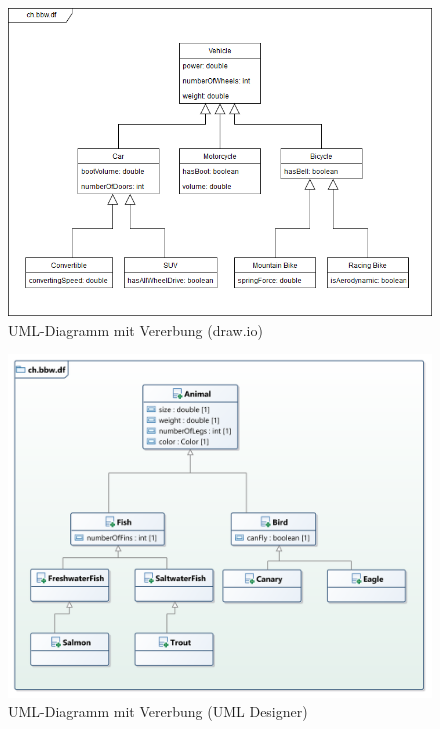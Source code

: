 \documentclass[a4paper, titlepage]{scrartcl}
\begin{document}
    \begin{figure}
        \includegraphics[width=\textwidth]{Klassendiagramm1a}
        \caption{UML-Diagramm mit Vererbung (draw.io)}
        \label{VererbungDrawIO}
    \end{figure}
    \begin{figure}
        \includegraphics[width=\textwidth]{Klassendiagramm1b}
        \caption{UML-Diagramm mit Vererbung (UML Designer)}
        \label{VererbungUmlDesigner}
    \end{figure}
\end{document}
